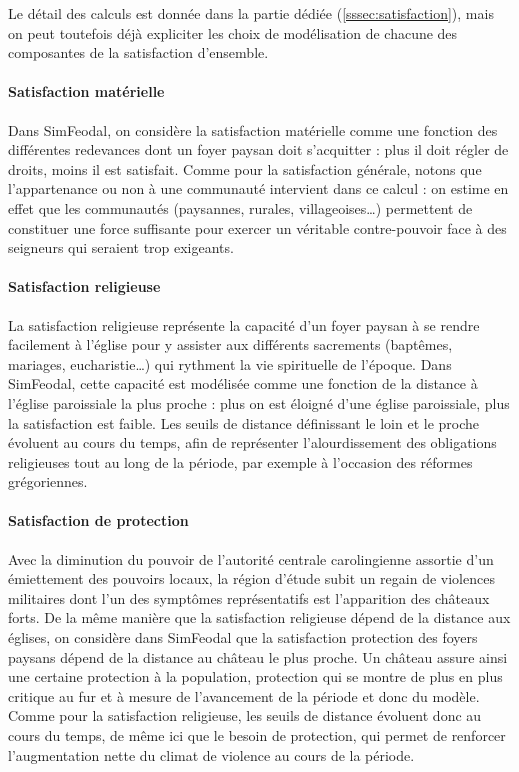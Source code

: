 Le détail des calculs est donnée dans la partie dédiée (\cref{sssec:satisfaction}), mais on peut toutefois déjà expliciter les choix de modélisation de chacune des composantes de la satisfaction d'ensemble.

\paragraph{Satisfaction matérielle}

Dans SimFeodal, on considère la satisfaction matérielle comme une fonction des différentes redevances dont un foyer paysan doit s'acquitter : plus il doit régler de droits, moins il est satisfait.
Comme pour la satisfaction générale, notons que l'appartenance ou non à une communauté intervient dans ce calcul : on estime en effet que les communautés (paysannes, rurales, villageoises\ldots) permettent de constituer une force suffisante pour exercer un véritable contre-pouvoir face à des seigneurs qui seraient trop exigeants.

\paragraph{Satisfaction religieuse}

La satisfaction religieuse représente la capacité d'un foyer paysan à se rendre facilement à l'église pour y assister aux différents sacrements (baptêmes, mariages, eucharistie\ldots) qui rythment la vie spirituelle de l'époque.
Dans SimFeodal, cette capacité est modélisée comme une fonction de la distance à l'église paroissiale la plus proche : plus on est éloigné d'une église paroissiale, plus la satisfaction est faible.
Les seuils de distance définissant le \og loin\fg{} et le \og proche\fg{} évoluent au cours du temps, afin de représenter l'alourdissement des obligations religieuses tout au long de la période, par exemple à l'occasion des réformes grégoriennes.

\paragraph{Satisfaction de \og protection\fg{}}

Avec la diminution du pouvoir de l'autorité centrale carolingienne assortie d'un émiettement des pouvoirs locaux, la région d'étude subit un regain de violences militaires dont l'un des symptômes représentatifs est l'apparition des châteaux forts.
De la même manière que la satisfaction religieuse dépend de la distance aux églises, on considère dans SimFeodal que la satisfaction \og protection\fg{} des foyers paysans dépend de la distance au château le plus proche.
Un château assure ainsi une certaine protection à la population, protection qui se montre de plus en plus critique au fur et à mesure de l'avancement de la période et donc du modèle.
Comme pour la satisfaction religieuse, les seuils de distance évoluent donc au cours du temps, de même ici que le \og besoin de protection\fg{}, qui permet de renforcer l'augmentation nette du climat de violence au cours de la période.

